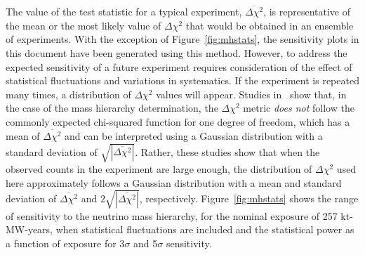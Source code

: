 The value of the test statistic for a typical experiment,  
$\overline{\Delta\chi^2}$, is
representative of the mean or the most likely value of $\Delta\chi^2$ that 
would be obtained in an ensemble of experiments.
With the exception of Figure~\ref{fig:mhstats}, the sensitivity plots
in this document have been generated using this method.
However, to address the expected sensitivity of a future experiment
requires consideration of the effect of
statistical fluctuations and variations in systematics.  If the
experiment is repeated many times, a distribution of $\Delta\chi^2$
values will appear.  Studies in~\cite{Qian:2012zn,Blennow:2013oma}
show that, in the case of the mass hierarchy
determination, the $\Delta \chi^2$ metric
{\em does not} follow the commonly expected chi-squared
function for one degree of freedom, which has a mean of
$\overline{\Delta\chi^2}$ and can be interpreted using a Gaussian
distribution with a standard deviation of
$\sqrt{|\overline{\Delta\chi^2}|}$. Rather, these studies show that
when the observed counts in the experiment are large enough,
the distribution of $\Delta\chi^2$ used here approximately follows
a Gaussian distribution with a
mean and standard deviation of $\overline{\Delta\chi^2}$ and
$2\sqrt{|\overline{\Delta\chi^2}|}$, respectively. Figure~\ref{fig:mhstats}
shows the range of sensitivity to the neutrino mass hierarchy, 
for the nominal exposure of 257 kt-MW-years,
when statistical
fluctuations are included and the statistical power as a function of exposure
for 3$\sigma$ and 5$\sigma$ sensitivity. 

